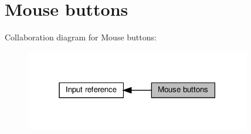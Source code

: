 \hypertarget{group__buttons}{}\section{Mouse buttons}
\label{group__buttons}
Collaboration diagram for Mouse buttons\+:
\nopagebreak
\begin{figure}[H]
\begin{center}
\leavevmode
\includegraphics[width=279pt]{group__buttons}
\end{center}
\end{figure}
